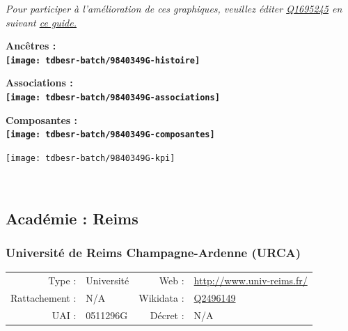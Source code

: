 \documentclass[12pt,french,]{article}
\begin{document}
\textit{\scriptsize Pour participer à l'amélioration de ces graphiques, veuillez éditer  \href{https://www.wikidata.org/entity/Q1695245}{Q1695245}  en suivant \href{https://github.com/cpesr/wikidataESR/blob/master/Rmd/wikidataESR.md}{ce guide.}}

\vspace{1cm}  
\begin{minipage}[b]{0.50\textwidth}\begin{center} \bf Ancêtres : \\  
\texttt{[image: tdbesr-batch/9840349G-histoire]} \end{center}\end{minipage}\begin{minipage}[b]{0.50\textwidth}\begin{center} \bf Associations : \\  
\texttt{[image: tdbesr-batch/9840349G-associations]} \end{center}\end{minipage}

\hrulefill

\begin{center} \bf Composantes : \\  
\texttt{[image: tdbesr-batch/9840349G-composantes]} \end{center}

\begin{center}\texttt{[image: tdbesr-batch/9840349G-kpi]} \end{center}\checkoddpage

\ifoddpage \fi ~\newpage  

\hypertarget{acaduxe9mie-reims}{%
\subsection{Académie : Reims}\label{acaduxe9mie-reims}}

\hypertarget{universituxe9-de-reims-champagne-ardenne-urca}{%
\subsubsection{Université de Reims Champagne-Ardenne
(URCA)}\label{universituxe9-de-reims-champagne-ardenne-urca}}

\begin{tabular*}{\textwidth}{rp{5cm}rl}  
\hline  
Type : & Université & Web : &\href{http://www.univ-reims.fr/}{http://www.univ-reims.fr/} \\  
Rattachement : & N/A & Wikidata : & \href{https://www.wikidata.org/entity/Q2496149}{Q2496149} \\  
UAI : & 0511296G & Décret : & N/A \\  
\hline  
\end{tabular*}
\end{document}
